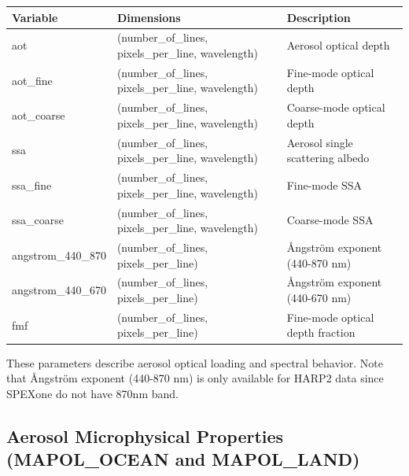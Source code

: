 \documentclass[
  11pt,
  letterpaper,
  DIV=11,
  numbers=noendperiod]{scrreprt}
\begin{document}
\begin{longtable}[]{@{}
  >{\raggedright\arraybackslash}p{}
  >{\raggedright\arraybackslash}p{}
  >{\raggedright\arraybackslash}p{}@{}}
\toprule\noalign{}
\begin{minipage}[b]{\linewidth}\raggedright
Variable
\end{minipage} & \begin{minipage}[b]{\linewidth}\raggedright
Dimensions
\end{minipage} & \begin{minipage}[b]{\linewidth}\raggedright
Description
\end{minipage} \\
\midrule\noalign{}
\endhead
\bottomrule\noalign{}
\endlastfoot
aot & (number\_of\_lines, pixels\_per\_line, wavelength) & Aerosol
optical depth \\
aot\_fine & (number\_of\_lines, pixels\_per\_line, wavelength) &
Fine-mode optical depth \\
aot\_coarse & (number\_of\_lines, pixels\_per\_line, wavelength) &
Coarse-mode optical depth \\
ssa & (number\_of\_lines, pixels\_per\_line, wavelength) & Aerosol
single scattering albedo \\
ssa\_fine & (number\_of\_lines, pixels\_per\_line, wavelength) &
Fine-mode SSA \\
ssa\_coarse & (number\_of\_lines, pixels\_per\_line, wavelength) &
Coarse-mode SSA \\
angstrom\_440\_870 & (number\_of\_lines, pixels\_per\_line) & Ångström
exponent (440-870 nm) \\
angstrom\_440\_670 & (number\_of\_lines, pixels\_per\_line) & Ångström
exponent (440-670 nm) \\
fmf & (number\_of\_lines, pixels\_per\_line) & Fine-mode optical depth
fraction \\
\end{longtable}

These parameters describe aerosol optical loading and spectral behavior.
Note that Ångström exponent (440-870 nm) is only available for HARP2
data since SPEXone do not have 870nm band.

\subsection{Aerosol Microphysical Properties (MAPOL\_OCEAN and
MAPOL\_LAND)}\label{aerosol-microphysical-properties-mapol_ocean-and-mapol_land}
\end{document}
